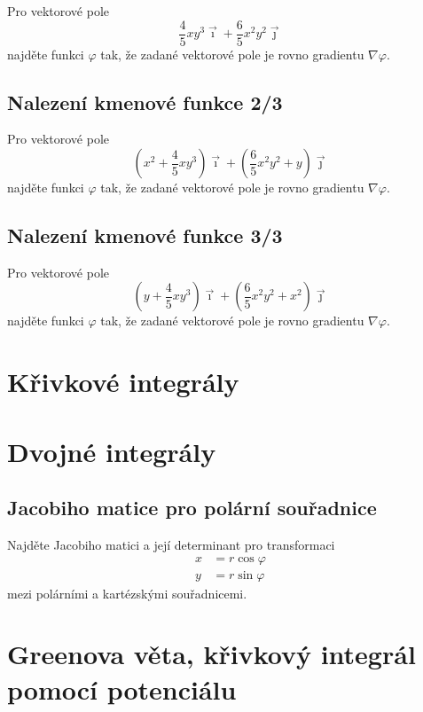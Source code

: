 Pro vektorové pole $$\frac 45 x y^3\vec \imath + \frac 65x^2y^2\vec\jmath$$ najděte funkci $\varphi$ tak, že zadané vektorové pole je rovno gradientu $\nabla \varphi.$

\subsection{Nalezení kmenové funkce 2/3}

Pro vektorové pole $$\left(x^2+\frac 45 x y^3\right)\vec \imath + \left(\frac 65x^2y^2+y\right)\vec\jmath$$ najděte funkci $\varphi$ tak, že zadané vektorové pole je rovno gradientu $\nabla \varphi.$

\subsection{Nalezení kmenové funkce 3/3}

Pro vektorové pole $$\left(y+\frac 45 x y^3\right)\vec \imath + \left(\frac 65x^2y^2+x^2\right)\vec\jmath$$ najděte funkci $\varphi$ tak, že zadané vektorové pole je rovno gradientu $\nabla \varphi.$




\section{Křivkové integrály}




\section{Dvojné integrály}


\subsection{Jacobiho matice pro polární souřadnice}

Najděte Jacobiho matici a její determinant pro transformaci 
\begin{equation*}
  \begin{aligned}
    x&=r\cos \varphi\\
    y&=r\sin \varphi
  \end{aligned}
\end{equation*}
mezi polárními a kartézskými souřadnicemi.


\section{Greenova věta, křivkový integrál pomocí potenciálu}

